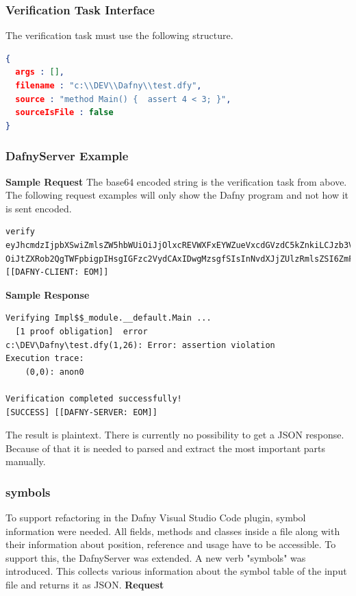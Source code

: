 \subsubsection{Verification Task Interface}\label{verificationtaskinterface}
The verification task must use the following structure. \newline

\begin{lstlisting}[language=json,firstnumber=1]
{
  args : [],
  filename : "c:\\DEV\\Dafny\\test.dfy",
  source : "method Main() {  assert 4 < 3; }",
  sourceIsFile : false
}

\end{lstlisting}

\subsubsection{DafnyServer Example}
\textbf{Sample Request}
The base64 encoded string is the verification task from above. 
The following request examples will only show the Dafny program and not how it is sent encoded. 
\begin{lstlisting}[language={},backgroundcolor=\color{background},basicstyle=\scriptsize\ttfamily]
verify
eyJhcmdzIjpbXSwiZmlsZW5hbWUiOiJjOlxcREVWXFxEYWZueVxcdGVzdC5kZnkiLCJzb3VyY2Ui
OiJtZXRob2QgTWFpbigpIHsgIGFzc2VydCAxIDwgMzsgfSIsInNvdXJjZUlzRmlsZSI6ZmFsc2V9
[[DAFNY-CLIENT: EOM]]
\end{lstlisting}



\textbf{Sample Response}
\begin{lstlisting}[language={},backgroundcolor=\color{background},basicstyle=\scriptsize\ttfamily]
Verifying Impl$$_module.__default.Main ...
  [1 proof obligation]  error
c:\DEV\Dafny\test.dfy(1,26): Error: assertion violation
Execution trace:
    (0,0): anon0

Verification completed successfully!
[SUCCESS] [[DAFNY-SERVER: EOM]]
\end{lstlisting}

The result is plaintext. There is currently no possibility to get a JSON response. Because of that it is needed to parsed and extract the most important parts manually. 


\subsubsection{symbols}
To support refactoring in the Dafny Visual Studio Code plugin, symbol information were needed. All fields, methods and classes inside a file along with their information about position, reference and usage have to be accessible. To support this, the DafnyServer was extended. A new verb "symbols" was introduced. This collects various information about the symbol table of the input file and returns it as JSON. 
\newline\newline
\textbf{Request}

